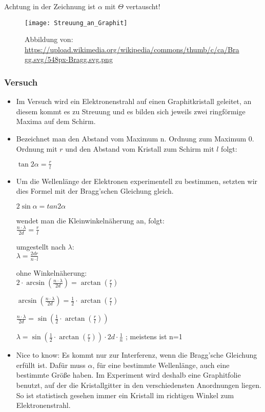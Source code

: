 Achtung in der Zeichnung ist $\alpha$ mit $\Theta$ vertauscht!

\begin{figure}[h!]
\centering \texttt{[image: Streuung\_an\_Graphit]}
\caption{Abbildung von: \url{https://upload.wikimedia.org/wikipedia/commons/thumb/c/ca/Bragg.svg/548px-Bragg.svg.png}}
\end{figure}



\subsubsection{Versuch}
\begin{itemize}
\item Im Versuch wird ein Elektronenstrahl auf einen Graphitkristall geleitet, an diesem kommt es zu Streuung und es bilden sich jeweils zwei ringförmige Maxima auf dem Schirm.
\item Bezeichnet man den Abstand vom Maximum n. Ordnung zum Maximum 0. Ordnung mit $r$ und den Abstand vom Kristall zum Schirm mit $l$ folgt:

$\tan{2\alpha} = \frac{r}{l}$
\item Um die Wellenlänge der Elektronen experimentell zu bestimmen, setzten wir dies Formel mit der Bragg'schen Gleichung gleich.

$2\sin{\alpha} = tan{2\alpha}$

wendet man die Kleinwinkelnäherung an, folgt: \\
\Large $\frac{n\cdot\lambda}{2d}=\frac{r}{l}$

\normalsize

umgestellt nach $\lambda$:\\
\Large $\lambda = \frac{2dr}{n\cdot l}$

\normalsize

ohne Winkelnäherung:\\
\Large $2\cdot\arcsin(\frac{n\cdot \lambda}{2d})=\arctan(\frac{r}{l}) $

\Large $\arcsin(\frac{n\cdot \lambda}{2d})=\frac{1}{2}\cdot\arctan(\frac{r}{l})$ 

\Large $\frac{n\cdot \lambda}{2d}=\sin(\frac{1}{2}\cdot\arctan(\frac{r}{l}))$ 

\Large $\lambda=\sin(\frac{1}{2}\cdot\arctan(\frac{r}{l}))\cdot 2d \cdot \frac{1}{n}$  ; meistens ist n=1 

\normalsize

\item Nice to know: Es kommt nur zur Interferenz, wenn die Bragg'sche Gleichung erfüllt ist. Dafür muss $\alpha$, für eine bestimmte Wellenlänge, auch eine bestimmte Größe haben. Im Experiment wird deshalb eine Graphitfolie benutzt, auf der die Kristallgitter in den verschiedensten Anordnungen liegen. So ist statistisch gesehen immer ein Kristall im richtigen Winkel zum Elektronenstrahl.
\end{itemize}

